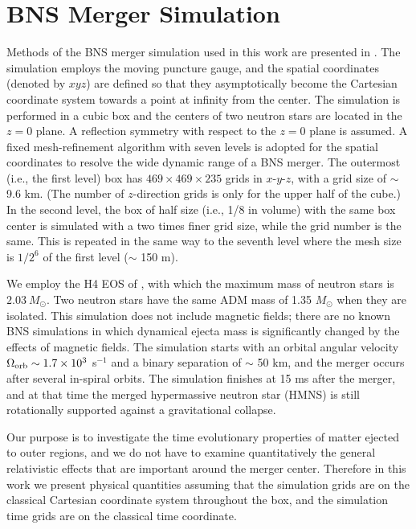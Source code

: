 \documentclass[]{pasj01}
\begin{document}
\section{BNS Merger Simulation}
\label{sec: Simulation & Method}

Methods of the BNS merger simulation used in this work are presented
in \citet{Kiuchi2014}. The simulation employs the moving puncture
gauge, and the spatial coordinates (denoted by $xyz$) are defined so
that they asymptotically become the Cartesian coordinate system
towards a point at infinity from the center.  The simulation is
performed in a cubic box and the centers of two neutron stars are
located in the $z=0$ plane.  A reflection symmetry with respect to the
$z=0$ plane is assumed.  A fixed mesh-refinement algorithm with seven
levels is adopted for the spatial coordinates to resolve the wide
dynamic range of a BNS merger. The outermost (i.e., the first level)
box has $469 \times 469 \times 235$ grids in $x$-$y$-$z$, with a grid
size of $\sim$ 9.6 km. (The number of $z$-direction grids is only for
the upper half of the cube.)  In the second level, the box of half
size (i.e., 1/8 in volume) with the same box center is simulated with
a two times finer grid size, while the grid number is the same. This
is repeated in the same way to the seventh level where the mesh size
is $1/2^6$ of the first level ($\sim$ 150 m).

We employ the H4 EOS of \citet{PhysRevLett.67.2414}, with which the
maximum mass of neutron stars is $2.03 \:M_{\odot}$. Two neutron stars
have the same ADM mass of 1.35 $M_{\odot}$ when they are
isolated. This simulation does not include magnetic fields; there are
no known BNS simulations in which dynamical ejecta mass is
significantly changed by the effects of magnetic fields.  The
simulation starts with an orbital angular velocity $\Omega_{\rm orb}
\sim 1.7 \times 10^3$ s$^{-1}$ and a binary separation of $\sim$ 50
km, and the merger occurs after several in-spiral orbits.  The
simulation finishes at 15 ms after the merger, and at that time the
merged hypermassive neutron star (HMNS) is still rotationally
supported against a gravitational collapse.

Our purpose is to investigate the time evolutionary properties of matter
ejected to outer regions, and we do not have to examine quantitatively the
general relativistic effects that are important around the merger
center.  Therefore in this work we present physical quantities
assuming that the simulation grids are on the classical Cartesian
coordinate system throughout the box, and the simulation time grids
are on the classical time coordinate.
\end{document}
